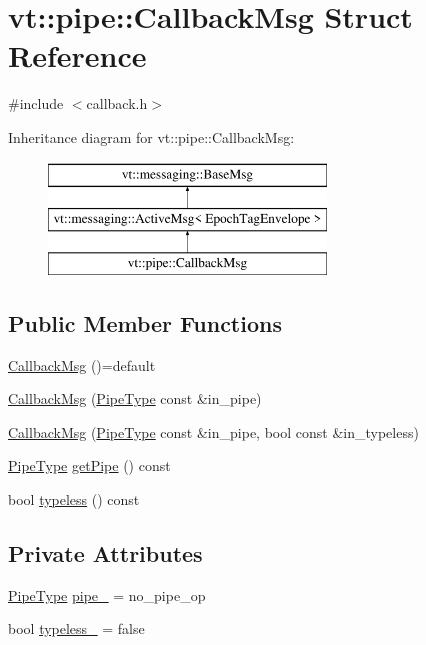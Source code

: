 \hypertarget{structvt_1_1pipe_1_1_callback_msg}{}\section{vt\+:\+:pipe\+:\+:Callback\+Msg Struct Reference}
\label{structvt_1_1pipe_1_1_callback_msg}


{\ttfamily \#include $<$callback.\+h$>$}

Inheritance diagram for vt\+:\+:pipe\+:\+:Callback\+Msg\+:\begin{figure}[H]
\begin{center}
\leavevmode
\includegraphics[height=3.000000cm]{structvt_1_1pipe_1_1_callback_msg}
\end{center}
\end{figure}
\subsection*{Public Member Functions}
\begin{DoxyCompactItemize}
\item 
\hyperlink{structvt_1_1pipe_1_1_callback_msg_a31175588e570e8c336713df369085818}{Callback\+Msg} ()=default
\item 
\hyperlink{structvt_1_1pipe_1_1_callback_msg_a7f76dcea5d02f81d3bec208875eaf711}{Callback\+Msg} (\hyperlink{namespacevt_ac9852acda74d1896f48f406cd72c7bd3}{Pipe\+Type} const \&in\+\_\+pipe)
\item 
\hyperlink{structvt_1_1pipe_1_1_callback_msg_a5d04652e2ec08b882a9f1caec0fee007}{Callback\+Msg} (\hyperlink{namespacevt_ac9852acda74d1896f48f406cd72c7bd3}{Pipe\+Type} const \&in\+\_\+pipe, bool const \&in\+\_\+typeless)
\item 
\hyperlink{namespacevt_ac9852acda74d1896f48f406cd72c7bd3}{Pipe\+Type} \hyperlink{structvt_1_1pipe_1_1_callback_msg_aeddb711b3d197e766b384692246ed4a5}{get\+Pipe} () const
\item 
bool \hyperlink{structvt_1_1pipe_1_1_callback_msg_ae7c7bf7e1998626719e0dd08ddfc8738}{typeless} () const
\end{DoxyCompactItemize}
\subsection*{Private Attributes}
\begin{DoxyCompactItemize}
\item 
\hyperlink{namespacevt_ac9852acda74d1896f48f406cd72c7bd3}{Pipe\+Type} \hyperlink{structvt_1_1pipe_1_1_callback_msg_ac35a396ab91b268d5ff972672955821c}{pipe\+\_\+} = no\+\_\+pipe\+\_\+op
\item 
bool \hyperlink{structvt_1_1pipe_1_1_callback_msg_aa5e11eb846c6b4d5efd168f7bb1c2f35}{typeless\+\_\+} = false
\end{DoxyCompactItemize}
